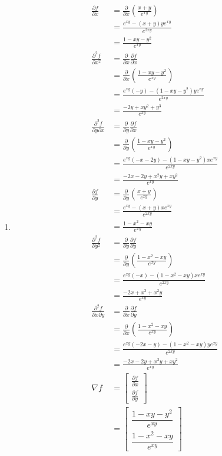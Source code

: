 \documentclass{article}
\begin{document}
\begin{enumerate}
\begin{enumerate}
 \item
  \begin{align*}
   \frac{\partial f}{\partial x}
   &= \frac{\partial}{\partial x}(\frac{x+y}{e^{xy}}) \\
   &= \frac{e^{xy} - (x+y)ye^{xy}}{e^{2xy}} \\
   &= \frac{1 - xy - y^2}{e^{xy}} \\
   \frac{\partial^2 f}{\partial x^2}
   &= \frac{\partial}{\partial x}\frac{\partial f}{\partial x} \\
   &= \frac{\partial}{\partial x}(\frac{1 - xy - y^2}{e^{xy}}) \\
   &= \frac{e^{xy}(-y) - (1 - xy - y^2)ye^{xy}}{e^{2xy}} \\
   &= \frac{-2y + xy^2 + y^3}{e^{xy}} \\
   \frac{\partial^2 f}{\partial y \partial x}
   &= \frac{\partial}{\partial y}\frac{\partial f}{\partial x} \\
   &= \frac{\partial}{\partial y}(\frac{1 - xy - y^2}{e^{xy}}) \\
   &= \frac{e^{xy}(-x - 2y) - (1 - xy - y^2)xe^{xy}}{e^{2xy}} \\
   &= \frac{-2x - 2y + x^2y + xy^2}{e^{xy}} \\
   \frac{\partial f}{\partial y}
   &= \frac{\partial}{\partial y}(\frac{x+y}{e^{xy}}) \\
   &= \frac{e^{xy} - (x+y)xe^{xy}}{e^{2xy}} \\
   &= \frac{1 - x^2 - xy}{e^{xy}} \\
   \frac{\partial^2 f}{\partial y^2}
   &= \frac{\partial}{\partial y}\frac{\partial f}{\partial y} \\
   &= \frac{\partial}{\partial y}(\frac{1 - x^2 - xy}{e^{xy}}) \\
   &= \frac{e^{xy}(-x) - (1 - x^2 - xy)xe^{xy}}{e^{2xy}} \\
   &= \frac{-2x + x^3 + x^2y}{e^{xy}} \\
   \frac{\partial^2 f}{\partial x \partial y}
   &= \frac{\partial}{\partial x}\frac{\partial f}{\partial y} \\
   &= \frac{\partial}{\partial x}(\frac{1 - x^2 - xy}{e^{xy}}) \\
   &= \frac{e^{xy}(-2x - y) - (1 - x^2 - xy)ye^{xy}}{e^{2xy}} \\
   &= \frac{-2x - 2y + x^2y + xy^2}{e^{xy}} \\
   \nabla f
   &= \begin{bmatrix}
       \frac{\partial f}{\partial x} \\
       \frac{\partial f}{\partial y}
      \end{bmatrix} \\
   &= \begin{bmatrix}
       \dfrac{1 - xy - y^2}{e^{xy}} \\
       \dfrac{1 - x^2 - xy}{e^{xy}}
      \end{bmatrix}
  \end{align*}


\end{enumerate}
\end{enumerate}
\end{document}
